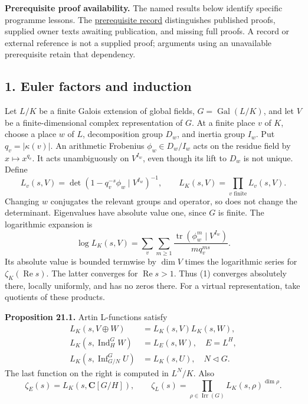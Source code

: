 \documentclass[11pt,a4paper]{article}
\begin{document}
\textbf{Prerequisite proof availability.} The named results below
identify specific programme lessons. The
\href{https://kokunoyumeto.github.io/open-math-courses/courses/NT-CFT/proof-dependencies.html\#lesson-21}{prerequisite
record} distinguishes published proofs, supplied owner texts awaiting
publication, and missing full proofs. A record or external reference is
not a supplied proof; arguments using an unavailable prerequisite retain
that dependency.

\subsection{1. Euler factors and
induction}\label{euler-factors-and-induction}

Let \(L/K\) be a finite Galois extension of global fields,
\(G=\operatorname{Gal}(L/K)\), and let \(V\) be a finite-dimensional
complex representation of \(G\). At a finite place \(v\) of \(K\),
choose a place \(w\) of \(L\), decomposition group \(D_w\), and inertia
group \(I_w\). Put \(q_v=|\kappa(v)|\). An arithmetic Frobenius
\(\phi_w\in D_w/I_w\) acts on the residue field by \(x\mapsto x^{q_v}\).
It acts unambiguously on \(V^{I_w}\), even though its lift to \(D_w\) is
not unique. Define \[
L_v(s,V)=\det(1-q_v^{-s}\phi_w\mid V^{I_w})^{-1},
\qquad L_K(s,V)=\prod_{v\text{ finite}}L_v(s,V).
\tag{1}
\] Changing \(w\) conjugates the relevant groups and operator, so does
not change the determinant. Eigenvalues have absolute value one, since
\(G\) is finite. The logarithmic expansion is \[
\log L_K(s,V)=\sum_v\sum_{m\geq1}
\frac{\operatorname{tr}(\phi_w^m\mid V^{I_w})}{m q_v^{ms}}.
\tag{2}
\] Its absolute value is bounded termwise by \(\dim V\) times the
logarithmic series for \(\zeta_K(\operatorname{Re}s)\). The latter
converges for \(\operatorname{Re}s>1\). Thus (1) converges absolutely
there, locally uniformly, and has no zeros there. For a virtual
representation, take quotients of these products.

\textbf{Proposition 21.1.} Artin L-functions satisfy \[
\begin{aligned}
L_K(s,V\oplus W)&=L_K(s,V)L_K(s,W),\\
L_K(s,\operatorname{Ind}_H^G W)&=L_E(s,W),\quad E=L^H,\\
L_K(s,\operatorname{Inf}_{G/N}^G U)&=L_K(s,U),\quad N\triangleleft G.
\end{aligned}
\tag{3}
\] The last function on the right is computed in \(L^N/K\). Also \[
\zeta_E(s)=L_K(s,\mathbf C[G/H]),\qquad
\zeta_L(s)=\prod_{\rho\in\operatorname{Irr}(G)}L_K(s,\rho)^{\dim\rho}.
\tag{4}
\]
\end{document}
